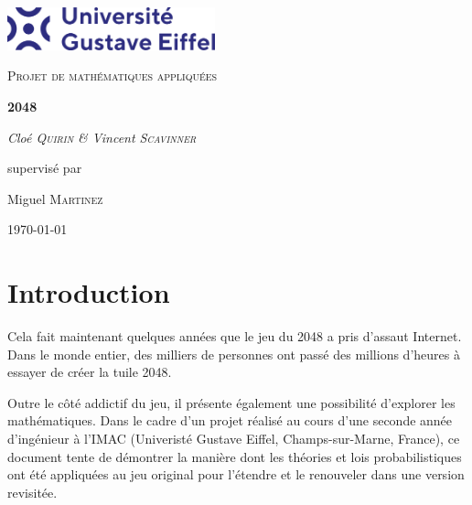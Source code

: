 \documentclass[a4paper, 12pt]{report}
\begin{document}
\begin{titlepage}

\centering

\includegraphics[width=0.45\textwidth]{images/gustave-eiffel-university.png}\par\vspace{1cm}

{\scshape\Large Projet de mathématiques appliquées\par}

\vspace{1.5cm}

{\huge\bfseries 2048\par}

\vspace{2cm}

{\Large\itshape Cloé \textsc{Quirin} \& Vincent \textsc{Scavinner}\par}

\vfill
supervisé par\par
Miguel \textsc{Martinez}
\vfill

{\large \today\par}

\end{titlepage}

\begin{abstract}
Rapport de projet documentant la réflexion et les choix d'implémentation réalisés dans le cadre de la conception d'une version revisitée du jeu 2048, utilisant des lois de probabilités mathématiques. 
\end{abstract}

\tableofcontents

\chapter{Introduction}

\tabto{1cm}Cela fait maintenant quelques années que le jeu du 2048 a pris d'assaut Internet.
Dans le monde entier, des milliers de personnes ont passé des millions d'heures à
essayer de créer la tuile 2048.

\vspace{0.5cm}

\tabto{1cm}Outre le côté addictif du jeu, il présente également une possibilité
d'explorer les mathématiques. Dans le cadre d'un projet réalisé au cours d'une seconde année d'ingénieur
à l'IMAC (Univeristé Gustave Eiffel, Champs-sur-Marne, France), ce document tente de
démontrer la manière dont les théories et lois probabilistiques ont été appliquées au jeu
original pour l'étendre et le renouveler dans une version revisitée.
\end{document}
